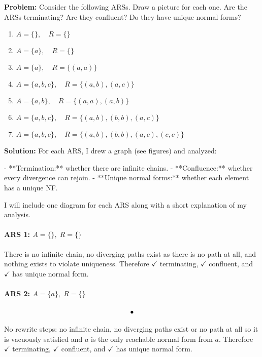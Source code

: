 \documentclass{article}
\theoremstyle{theorem}
\theoremstyle{definition}
\theoremstyle{remark}
\begin{document}
\textbf{Problem:} Consider the following ARSs. Draw a picture for each one. 
Are the ARSs terminating? Are they confluent? Do they have unique normal forms?

\begin{enumerate}
  \item $A = \{\}, \quad R = \{\}$
  \item $A = \{a\}, \quad R = \{\}$
  \item $A = \{a\}, \quad R = \{(a,a)\}$
  \item $A = \{a,b,c\}, \quad R = \{(a,b),(a,c)\}$
  \item $A = \{a,b\}, \quad R = \{(a,a),(a,b)\}$
  \item $A = \{a,b,c\}, \quad R = \{(a,b),(b,b),(a,c)\}$
  \item $A = \{a,b,c\}, \quad R = \{(a,b),(b,b),(a,c),(c,c)\}$
\end{enumerate}

\textbf{Solution:}  
For each ARS, I drew a graph (see figures) and analyzed:

- **Termination:** whether there are infinite chains.  
- **Confluence:** whether every divergence can rejoin.  
- **Unique normal forms:** whether each element has a unique NF.

I will include one diagram for each ARS along with a short explanation of my analysis.

\paragraph{ARS 1: $A = \{\}, \; R = \{\}$}

There is no infinite chain, no diverging paths exist as there is no path at all, and 
nothing exists to violate uniqueness. Therefore $\checkmark$ terminating, $\checkmark$ confluent, 
and $\checkmark$ has unique normal form.

\paragraph{ARS 2: $A = \{a\}, \; R = \{\}$}

\[\begin{tikzcd}
	\bullet
\end{tikzcd}\]

No rewrite steps: no infinite chain, no diverging paths exist or no path at all so it is vacuously satisfied and $a$ is the only reachable normal form from $a$. Therefore $\checkmark$ terminating, $\checkmark$ confluent, and $\checkmark$ has unique normal form.
\end{document}
